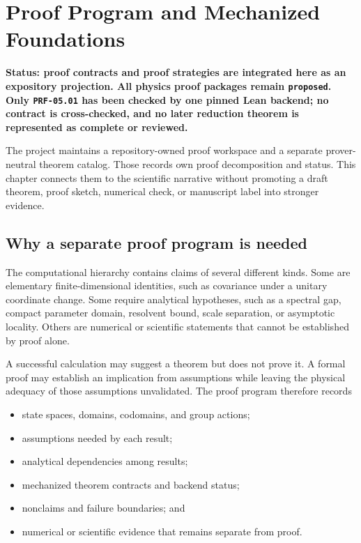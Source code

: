 \chapter{Proof Program and Mechanized Foundations}
\label{ch:proof-program}

\textbf{Status: proof contracts and proof strategies are integrated here as an
expository projection. All physics proof packages remain \texttt{proposed}.
Only \texttt{PRF-05.01} has been checked by one pinned Lean backend; no contract
is cross-checked, and no later reduction theorem is represented as complete or
reviewed.}

The project maintains a repository-owned proof workspace and a separate
prover-neutral theorem catalog. Those records own proof decomposition and
status. This chapter connects them to the scientific narrative without
promoting a draft theorem, proof sketch, numerical check, or manuscript label
into stronger evidence.

\section{Why a separate proof program is needed}

The computational hierarchy contains claims of several different kinds. Some
are elementary finite-dimensional identities, such as covariance under a
unitary coordinate change. Some require analytical hypotheses, such as a
spectral gap, compact parameter domain, resolvent bound, scale separation, or
asymptotic locality. Others are numerical or scientific statements that cannot
be established by proof alone.

A successful calculation may suggest a theorem but does not prove it. A formal
proof may establish an implication from assumptions while leaving the physical
adequacy of those assumptions unvalidated. The proof program therefore records

\begin{itemize}
  \item state spaces, domains, codomains, and group actions;
  \item assumptions needed by each result;
  \item analytical dependencies among results;
  \item mechanized theorem contracts and backend status;
  \item nonclaims and failure boundaries; and
  \item numerical or scientific evidence that remains separate from proof.
\end{itemize}

